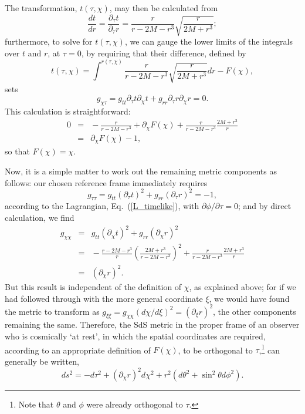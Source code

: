 The transformation, $t(\tau,\chi)$, may then be calculated from
\begin{equation}
\frac{dt}{dr}=\frac{\partial_{\tau}t}{\partial_{\tau}r}=\frac{r}{r-2M-r^3}\sqrt{\frac{r}{2M+r^3}};
\end{equation}
furthermore, to solve for $t(\tau,\chi)$, we can gauge the lower limits of the integrals over $t$ and $r$, at $\tau=0$, by requiring that their difference, defined by 
\begin{equation}
t(\tau,\chi)=\int^{r(\tau,\chi)}\frac{r}{r-2M-r^3}\sqrt{\frac{r}{2M+r^3}}dr-F(\chi),\label{t(tau,chi)}
\end{equation}
sets 
\begin{equation}
g_{\chi\tau}=g_{tt}\partial_{\tau}t\partial_{\chi}t+g_{rr}\partial_{\tau}r\partial_{\chi}r=0.\label{g_chit}
\end{equation} 
This calculation is straightforward:
\begin{eqnarray}
0\!\!\!&=&\!\!\!-\frac{r}{r-2M-r^3}+\partial_{\chi}F(\chi)+\frac{r}{r-2M-r^3}\frac{2M+r^3}{r}\\
\!\!\!&=&\!\!\!\partial_{\chi}F(\chi)-1,
\end{eqnarray}
so that $F(\chi)=\chi$.

Now, it is a simple matter to work out the remaining metric components as follows: our chosen reference frame immediately requires 
\begin{equation}
g_{\tau\tau}=g_{tt}(\partial_{\tau}t)^2+g_{rr}(\partial_{\tau}r)^2=-1,\label{g_tt}
\end{equation} 
according to the Lagrangian, Eq.~(\ref{L_timelike}), with $\partial\phi/\partial\tau=0$; and by direct calculation, we find
\begin{eqnarray}
g_{\chi\chi}\!\!\!&=&\!\!\!g_{tt}(\partial_{\chi}t)^2+g_{rr}(\partial_{\chi}r)^2\\
\!\!\!&=&\!\!\!-\frac{r-2M-r^3}{r}\left(\frac{2M+r^3}{r-2M-r^3}\right)^{2}+\frac{r}{r-2M-r^3}\frac{2M+r^3}{r}\\
\!\!\!&=&\!\!\!(\partial_{\chi}r)^2.\label{g_chichi}
\end{eqnarray} 
But this result is independent of the definition of $\chi$, as explained above; for if we had followed through with the more general coordinate $\xi$, we would have found the metric to transform as $g_{\xi\xi}=g_{\chi\chi}(d\chi/d\xi)^2=(\partial_{\xi}r)^2$, the other components remaining the same. Therefore, the SdS metric in the proper frame of an observer who is cosmically `at rest', in which the spatial coordinates are required, according to an appropriate definition of $F(\chi)$, to be orthogonal to $\tau$,\footnote{Note that $\theta$ and $\phi$ were already orthogonal to $\tau$.} can generally be written,
\begin{equation}
ds^2=-d\tau^2+\left(\partial_{\chi}r\right)^2d\chi^2+r^2\left(d\theta^2+\sin^2\theta{d\phi}^2\right).\label{SdS_proper}
\end{equation}

